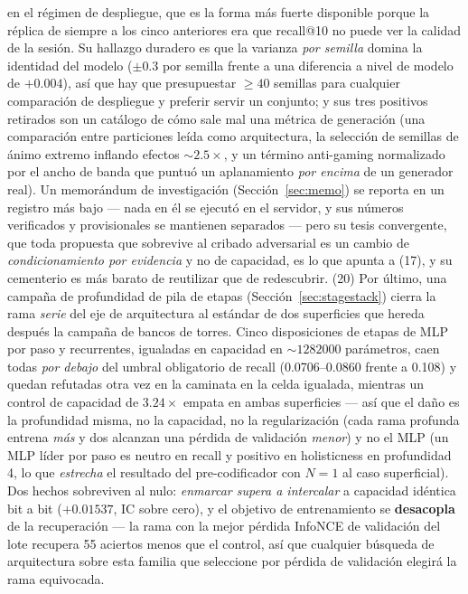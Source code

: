 \documentclass[11pt]{article}
\begin{document}
en el régimen de despliegue, que es la forma más fuerte disponible porque la réplica
de siempre a los cinco anteriores era que recall@10 no puede ver la calidad de la
sesión. Su hallazgo duradero es que la varianza \emph{por semilla} domina la
identidad del modelo ($\pm\num{0.3}$ por semilla frente a una diferencia a nivel de
modelo de $+\num{0.004}$), así que hay que presupuestar $\ge\num{40}$ semillas para
cualquier comparación de despliegue y preferir servir un conjunto; y sus tres
positivos retirados son un catálogo de cómo sale mal una métrica de generación (una
comparación entre particiones leída como arquitectura, la selección de semillas de
ánimo extremo inflando efectos ${\sim}\num{2.5}\times$, y un término anti-gaming
normalizado por el ancho de banda que puntuó un aplanamiento \emph{por encima} de un
generador real). Un memorándum de investigación (Sección~\ref{sec:memo}) se reporta
en un registro más bajo --- nada en él se ejecutó en el servidor, y sus números
verificados y provisionales se mantienen separados --- pero su tesis convergente, que
toda propuesta que sobrevive al cribado adversarial es un cambio de
\emph{condicionamiento por evidencia} y no de capacidad, es lo que apunta a (17), y
su cementerio es más barato de reutilizar que de redescubrir.
(20) Por último, una campaña de profundidad de pila de etapas
(Sección~\ref{sec:stagestack}) cierra la rama \emph{serie} del eje de arquitectura
al estándar de dos superficies que hereda después la campaña de bancos de torres.
Cinco disposiciones de etapas de MLP por paso y recurrentes, igualadas en capacidad
en ${\sim}\num{1282000}$ parámetros, caen todas \emph{por debajo} del umbral
obligatorio de recall (\numrange{0.0706}{0.0860} frente a \num{0.108}) y quedan
refutadas otra vez en la caminata en la celda igualada, mientras un control de
capacidad de $\num{3.24}\times$ empata en ambas superficies --- así que el daño es la
profundidad misma, no la capacidad, no la regularización (cada rama profunda entrena
\emph{más} y dos alcanzan una pérdida de validación \emph{menor}) y no el MLP (un MLP
líder por paso es neutro en recall y positivo en holisticness en profundidad 4, lo
que \emph{estrecha} el resultado del pre-codificador con $N=1$ al caso superficial).
Dos hechos sobreviven al nulo: \emph{enmarcar supera a intercalar} a capacidad
idéntica bit a bit ($+\num{0.01537}$, IC sobre cero), y el objetivo de entrenamiento
se \textbf{desacopla} de la recuperación --- la rama con la mejor pérdida InfoNCE de
validación del lote recupera \num{55} aciertos menos que el control, así que
cualquier búsqueda de arquitectura sobre esta familia que seleccione por pérdida de
validación elegirá la rama equivocada.
\end{document}
